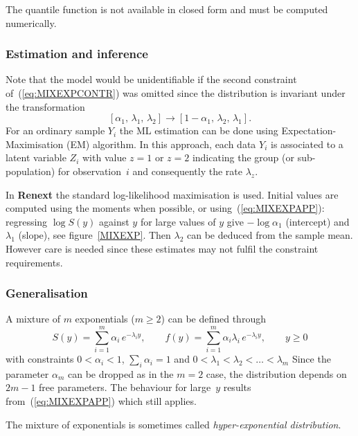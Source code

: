 \documentclass[a4paper]{report}
\begin{document}
The quantile function is not available in closed form and must be
computed numerically.

\subsubsection*{Estimation and inference}
Note that the model would be unidentifiable if the second
constraint of~(\ref{eq:MIXEXPCONTR}) was omitted since the
distribution is invariant under the transformation
$$
   [\alpha_1,\,\lambda_1,\,\lambda_2] \rightarrow [1-\alpha_1,\,\lambda_2,\,\lambda_1].
$$
For an ordinary sample $Y_i$ the ML estimation can be done using
Expectation-Maximisation (EM)
%
algorithm.  In this approach, each data $Y_i$ is associated to a
latent variable $Z_i$ with value $z=1$ or $z=2$ indicating the group
(or sub-population) for observation~$i$ and consequently the rate
$\lambda_z$.

In \textbf{Renext} the standard log-likelihood maximisation is used. 
Initial values are computed using the moments when possible, or
using~(\ref{eq:MIXEXPAPP}): regressing
$\log S(y)$ against $y$ for large values of $y$ give 
$-\log \alpha_1$ (intercept) and $\lambda_1$ (slope), see figure~\ref{MIXEXP}. 
Then $\lambda_2$ can be deduced from the sample mean. However
care is needed since these estimates may not fulfil the constraint requirements. 

\subsubsection*{Generalisation}
A  mixture of $m$ exponentials ($m \geqslant 2$) can be defined through
$$ 
   S(y) = \sum_{i=1}^m \alpha_i\,e^{-\lambda_i y}, \qquad 
   f(y) = \sum_{i=1}^m \alpha_i\lambda_i\,e^{-\lambda_i y}, \qquad 
   y \geqslant 0
$$
with constraints $0 < \alpha_i < 1$, $\sum_i \alpha_i =1$ and 
$0 < \lambda_1 < \lambda_2 < \dots < \lambda_m$
Since the parameter $\alpha_m$ can be dropped as in the $m=2$ case,
the distribution depends on $2m-1$ free parameters.
The behaviour for large~$y$ results from~(\ref{eq:MIXEXPAPP}) which still applies.

The mixture of exponentials is sometimes called \textit{hyper-exponential distribution}.
\end{document}
